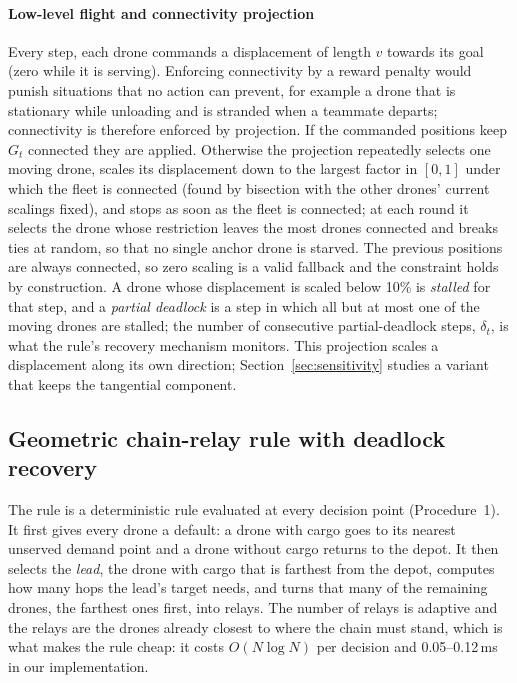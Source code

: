 \documentclass[final,5p,times,twocolumn]{elsarticle}
\begin{document}
\paragraph{Low-level flight and connectivity projection}
Every step, each drone commands a displacement of length $v$ towards its goal (zero while it is
serving). Enforcing connectivity by a reward penalty would punish situations that no action can
prevent, for example a drone that is stationary while unloading and is stranded when a teammate
departs; connectivity is therefore enforced by projection. If the commanded positions keep
$G_t$ connected they are applied. Otherwise the projection repeatedly selects one moving drone,
scales its displacement down to the largest factor in $[0,1]$ under which the fleet is connected
(found by bisection with the other drones' current scalings fixed), and stops as soon as the
fleet is connected; at each round it selects the drone whose restriction leaves the most drones
connected and breaks ties at random, so that no single anchor drone is starved. The previous
positions are always connected, so zero scaling is a valid fallback and the constraint holds by
construction. A drone whose displacement is scaled below 10\% is \emph{stalled} for that step,
and a \emph{partial deadlock} is a step in which all but at most one of the moving drones are
stalled; the number of consecutive partial-deadlock steps, $\delta_t$, is what the rule's
recovery mechanism monitors. This projection scales a displacement along its own direction;
Section~\ref{sec:sensitivity} studies a variant that keeps the tangential component.

\subsection{Geometric chain-relay rule with deadlock recovery}
\label{sec:rule}

The rule is a deterministic rule evaluated at every decision point
(Procedure~1). It first gives every drone a default: a drone with cargo goes to
its nearest unserved demand point and a drone without cargo returns to the depot. It then selects
the \emph{lead}, the drone with cargo that is farthest from the depot, computes how many hops the
lead's target needs, and turns that many of the remaining drones, the farthest ones first, into
relays. The number of relays is adaptive and the relays are the drones already closest to where
the chain must stand, which is what makes the rule cheap: it costs $O(N \log N)$ per decision
and 0.05--0.12\,ms in our implementation.
\end{document}
